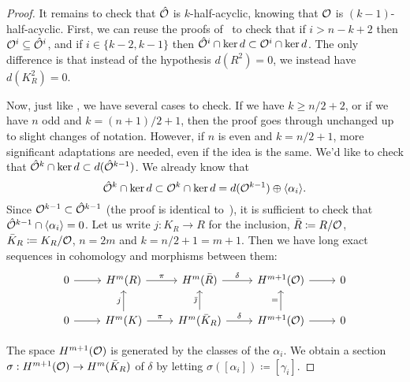 \begin{proof}
  It remains to check that $\hat{\mathcal{O}}$ is $k$-half-acyclic, knowing that $\mathcal{O}$ is $(k-1)$-half-acyclic.
  First, we can reuse the proofs of~\cite[Lemmas~5.2 and~5.3]{LambrechtsStanley2008} to check that if $i > n-k+2$ then $\mathcal{O}^{i} \subseteq \hat{\mathcal{O}}^{i}$, and if $i \in \{ k-2, k-1 \}$ then $\hat{\mathcal{O}}^{i} \cap \ker d \subset \mathcal{O}^{i} \cap \ker d$.
  The only difference is that instead of the hypothesis $d(R^{2}) = 0$, we instead have $d(K_{R}^{2}) = 0$.
   
  Now, just like \cite{LambrechtsStanley2008}, we have several cases to check.
  If we have $k \geq n/2 + 2$, or if we have $n$ odd and $k = (n+1)/2 + 1$, then the proof goes through unchanged up to slight changes of notation.
  However, if $n$ is even and $k = n/2 + 1$, more significant adaptations are needed, even if the idea is the same.
  We'd like to check that $\hat{\mathcal{O}}^{k} \cap \ker d \subset d(\hat{\mathcal{O}}^{k-1})$.
  We already know that
  \begin{equation}
    \hat{\mathcal{O}}^{k} \cap \ker d \subset \mathcal{O}^{k} \cap \ker d = d(\mathcal{O}^{k-1}) \oplus \langle \alpha_{i} \rangle.
  \end{equation}
  Since $\mathcal{O}^{k-1} \subset \hat{\mathcal{O}}^{k-1}$ (the proof is identical to~\cite[Lemma~5.7]{LambrechtsStanley2008}), it is sufficient to check that $\hat{\mathcal{O}}^{k-1} \cap \langle \alpha_{i} \rangle = 0$.
  Let us write $j : K_{R} \to R$ for the inclusion, $\bar{R} \coloneqq R / \mathcal{O}$, $\bar{K}_{R} \coloneqq K_{R} / \mathcal{O}$, $n = 2m$ and $k = n/2 + 1 = m + 1$.
  Then we have long exact sequences in cohomology and morphisms between them:
  \begin{equation}
    \begin{tikzcd}
      0 \rar
      & H^{m}(R) \rar{\pi}
      & H^{m}(\bar{R}) \rar{\delta}
      & H^{m+1}(\OO) \rar
      & 0
      \\
      0 \rar
      & H^{m}(K) \rar{\pi} \uar{j}
      & H^{m}(\bar{K}_{R}) \rar{\delta} \uar{\bar{\jmath}}
      & H^{m+1}(\OO) \rar \uar{=}
      & 0
    \end{tikzcd}
  \end{equation}
   
  The space $H^{m+1}(\mathcal{O})$ is generated by the classes of the $\alpha_{i}$.
  We obtain a section $\sigma : H^{m+1}(\mathcal{O}) \to H^{m}(\bar{K}_{R})$ of $\delta$ by letting $\sigma([\alpha_{i}]) \coloneqq [\gamma_{i}]$.
   

\end{proof}
